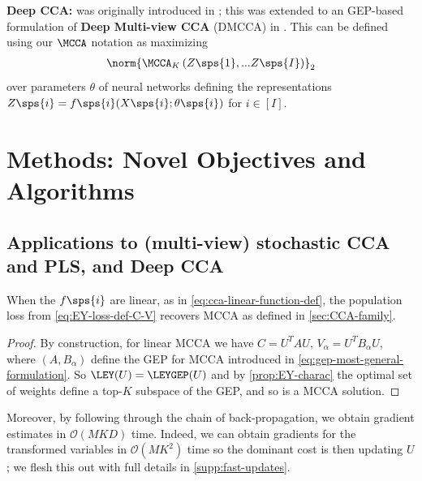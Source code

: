 \textbf{Deep CCA:} was originally introduced in \cite{andrew2013deep}; this was extended to an GEP-based formulation of \textbf{Deep Multi-view CCA} (DMCCA) in \cite{somandepalli2019multimodal}. This can be defined using our $\MCCA$ notation as maximizing
\begin{align}
    \label{eq:DMCCA-def}
    \norm{\MCCA_K\left(Z\sps{1}, ... Z\sps{I}\right)}_2
\end{align}
over parameters $\theta$ of neural networks defining the representations $Z\sps{i}=f\sps{i}(X\sps{i};\theta\sps{i})$ for $i\in[I]$.

\section{Methods: Novel Objectives and Algorithms}\label{sec:contributions}

\subsection{Applications to (multi-view) stochastic CCA and PLS, and Deep CCA}
\begin{lemma}
    When the $f\sps{i}$ are linear, as in \cref{eq:cca-linear-function-def}, the population loss from \cref{eq:EY-loss-def-C-V} recovers MCCA as defined in \cref{sec:CCA-family}. %
\end{lemma}
\begin{proof}
    By construction, for linear MCCA we have $C = U^T A U,\, V_\alpha=U^T B_\alpha U$, where $(A, B_\alpha)$ define the GEP for MCCA introduced in \cref{eq:gep-most-general-formulation}.
    So $\LEY(U) = \LEYGEP(U)$ and by \cref{prop:EY-charac} the optimal set of weights define a top-$K$ subspace of the GEP, and so is a MCCA solution.
\end{proof}

Moreover, by following through the chain of back-propagation, we obtain gradient estimates in $\mathcal{O}(MKD)$ time.
Indeed, we can obtain gradients for the transformed variables in $\mathcal{O}(M K^2)$ time so the dominant cost is then updating $U$; we flesh this out with full details in \cref{supp:fast-updates}.


